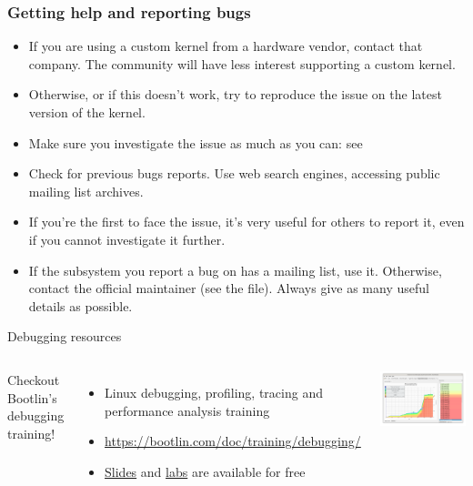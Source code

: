 \begin{frame}
  \frametitle{Getting help and reporting bugs}
  \begin{itemize}
  \item If you are using a custom kernel from a hardware vendor, contact
        that company. The community will have less interest supporting
        a custom kernel.
  \item Otherwise, or if this doesn't work, try to reproduce the
        issue on the latest version of the kernel.
  \item Make sure you investigate the issue as much as you can: see
  \item Check for previous bugs reports. Use web search engines,
    accessing public mailing list archives.
  \item If you're the first to face the issue, it's very useful for
    others to report it, even if you cannot investigate it further.
  \item If the subsystem you report a bug on has a mailing list, use
    it. Otherwise, contact the official maintainer (see the
     file). Always give as many useful details as
    possible.
  \end{itemize}
\end{frame}

\begin{frame}{Debugging resources}
  \begin{columns}
    Checkout Bootlin's debugging training!
    \begin{itemize}
    \item Linux debugging, profiling, tracing and performance analysis training
    \item \url{https://bootlin.com/doc/training/debugging/}
    \item \href{https://bootlin.com/doc/training/debugging/debugging-slides.pdf}{Slides}
      and
      \href{https://bootlin.com/doc/training/debugging/debugging-labs.pdf}{labs}
      are available for free
    \end{itemize}
    \includegraphics[width=1\textwidth]{slides/kernel-driver-development-debugging/debugging-screenshot.png}
  \end{columns}
\end{frame}

